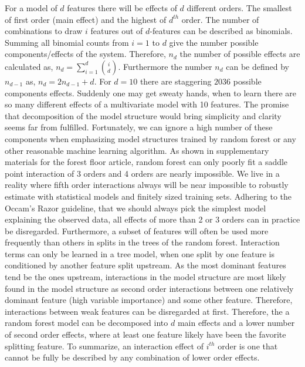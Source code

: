 For a model of $d$ features there will be effects of $d$ different orders. The smallest of first order (main effect) and the highest of $d^{th}$ order. The number of combinations to draw $i$ features out of $d$-features can be described as binomials. Summing all binomial counts from $i=1$ to $d$ give the number possible components/effects of the system. Therefore, $n_d$ the number of possible effects are calculated as, 
$n_d = \sum_{i=1}^{d} \binom{i}{d}$. Furthermore the number $n_d$ can be defined by $n_{d-1}$ as,
$n_d = 2n_{d-1} + d$. For $d=10$ there are staggering $2036$ possible components effects. Suddenly one may get sweaty hands, when to learn there are so many different effects of a multivariate model with 10 features. The promise that decomposition of the model structure would bring simplicity and clarity seems far from fulfilled. Fortunately, we can ignore a high number of these components when emphasizing model structures trained by random forest or any other reasonable machine learning algorithm. As shown in supplementary materials for the forest floor article, random forest can only poorly fit a saddle point interaction of 3 orders and 4 orders are nearly impossible. We live in a reality where fifth order interactions always will be near impossible to robustly estimate with statistical models and finitely sized training sets. Adhering to the Occam's Razor guideline, that we should always pick the simplest model explaining the observed data, all effects of more than 2 or 3 orders can in practice be disregarded. Furthermore, a subset of features will often be used more frequently than others in splits in the trees of the random forest. Interaction terms can only be learned in a tree model, when one split by one feature is conditioned by another feature split upstream. As the most dominant features tend be the ones upstream, interactions in the model structure are most likely found in the model structure as second order interactions between one relatively dominant feature (high variable importance) and some other feature. Therefore, interactions between weak features can be disregarded at first. Therefore, the a random forest model can be decomposed into $d$ main effects and a lower number of second order effects, where at least one feature likely have been the favorite splitting feature. To summarize, an interaction effect of $i^{th}$ order is one that cannot be fully be described by any combination of lower order effects.


